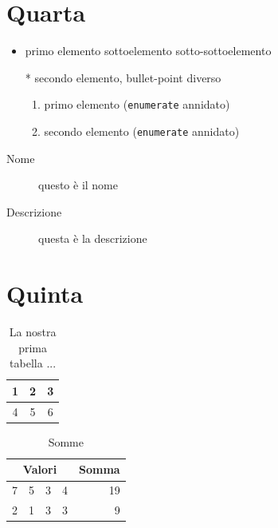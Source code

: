 \documentclass{article}
\begin{document}
	\clearpage
	
	\section{Quarta}
	
	\blindtext	
	
	\begin{itemize}
		\item primo elemento
		\subitem sottoelemento
		\subsubitem sotto-sottoelemento
		\item[*] secondo elemento, bullet-point diverso
		\begin{enumerate}
			\item primo elemento (\verb|enumerate| annidato)
			\item secondo elemento (\verb|enumerate| annidato)
			\end{enumerate}
	\end{itemize}

	\blindtext

	\begin{description}
		\item[Nome] questo è il nome
		\item[Descrizione] questa è la descrizione 
	\end{description}
	
	\clearpage
	
	\section*{Quinta}
	
	\begin{table}[h]
		\centering
		\begin{tabular}{|c|c|c|}
			\hline
			1 & 2 & 3 \\ 
			\hline 
			4 & 5 & 6 \\ 
			\hline 
		\end{tabular}
	\caption{La nostra prima tabella ...}
	\label{tab:tab1}
	\end{table}
	
	\begin{table}[h]
	\centering
		\begin{tabular}{ | c c c c | r |}
		\cline{1-4}
		\multicolumn{4}{|c|}{Valori} &
		        \multicolumn{1}{l}{Somma} \\
		\hline
		7 & 5 & 3 & 4 & 19 \\ 2&1&3&3& 9\\ \hline
		\end{tabular} 
	\caption{Somme} 
	\label{tab:somme} 
	\end{table}\
\end{document}
